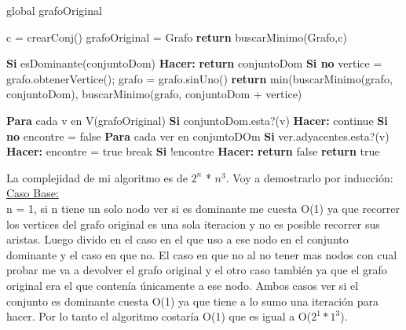 global grafoOriginal

\begin{codebox}
\li	c = crearConj()
\li	grafoOriginal = Grafo
\li	\textbf{return} buscarMinimo(Grafo,c)
\end{codebox}

\begin{codebox}
\li\textbf{Si} esDominante(conjuntoDom) \textbf{Hacer:} \Do
\li		\textbf{return} conjuntoDom 
\End
\li	\textbf{Si no}  \Do
\li		vertice = grafo.obtenerVertice(); 
\li		grafo = grafo.sinUno()
\li		\textbf{return} min(buscarMinimo(grafo, conjuntoDom), buscarMinimo(grafo, conjuntoDom + vertice)	
\End

\end{codebox}

\begin{codebox}
\li \textbf{Para} cada v en V(grafoOriginal) \Do
\li \textbf{Si} conjuntoDom.esta?(v) \textbf{Hacer:} \Do
\li			continue 
		\End
\li \textbf{Si no}  \Do
\li			encontre = false
\li \textbf{Para} cada ver en conjuntoDOm \Do
\li	\textbf{Si} ver.adyacentes.esta?(v) \textbf{Hacer:} \Do	
\li			encontre = true
\li			break
			\End
	\End		
\li	\textbf{Si} !encontre \textbf{Hacer:} \Do				
\li		\textbf{return} false
			\End		
	\End
\li	\textbf{return} true
\End
\end{codebox}
La complejidad de mi algoritmo es de $2^n$ * $n^3$. Voy a demostrarlo por inducción:\\

\underline{Caso Base:}\\

n = 1, si n tiene un solo nodo ver si es dominante me cuesta O(1) ya que recorrer los vertices del grafo original es una sola iteracion y no es posible recorrer sus aristas. Luego divido en el caso en el que uso a ese nodo en el conjunto dominante y el caso en que no. El caso en que no al no tener mas nodos con cual probar me va a devolver el grafo original y el otro caso también ya que el grafo original era el que contenía únicamente a ese nodo. Ambos casos ver si el conjunto es dominante cuesta O(1) ya que tiene a lo sumo una iteración para hacer. Por lo tanto el algoritmo costaría O(1) que es igual a O($2^1*1^3$).\\

